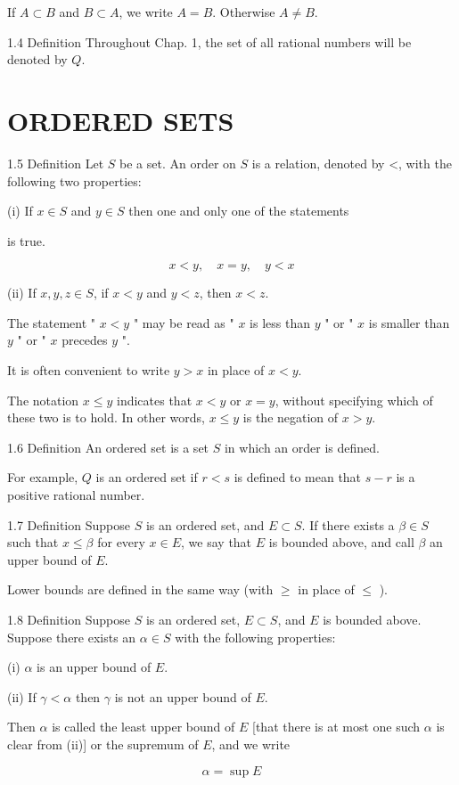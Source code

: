 \documentclass[10pt]{article}
\begin{document}
If $A \subset B$ and $B \subset A$, we write $A=B$. Otherwise $A \neq B$.

1.4 Definition Throughout Chap. 1, the set of all rational numbers will be denoted by $Q$.

\section{ORDERED SETS}
1.5 Definition Let $S$ be a set. An order on $S$ is a relation, denoted by <, with the following two properties:

(i) If $x \in S$ and $y \in S$ then one and only one of the statements

is true.

$$
x<y, \quad x=y, \quad y<x
$$

(ii) If $x, y, z \in S$, if $x<y$ and $y<z$, then $x<z$.

The statement " $x<y$ " may be read as " $x$ is less than $y$ " or " $x$ is smaller than $y$ " or " $x$ precedes $y$ ".

It is often convenient to write $y>x$ in place of $x<y$.

The notation $x \leq y$ indicates that $x<y$ or $x=y$, without specifying which of these two is to hold. In other words, $x \leq y$ is the negation of $x>y$.

1.6 Definition An ordered set is a set $S$ in which an order is defined.

For example, $Q$ is an ordered set if $r<s$ is defined to mean that $s-r$ is a positive rational number.

1.7 Definition Suppose $S$ is an ordered set, and $E \subset S$. If there exists a $\beta \in S$ such that $x \leq \beta$ for every $x \in E$, we say that $E$ is bounded above, and call $\beta$ an upper bound of $E$.

Lower bounds are defined in the same way (with $\geq$ in place of $\leq$ ).

1.8 Definition Suppose $S$ is an ordered set, $E \subset S$, and $E$ is bounded above. Suppose there exists an $\alpha \in S$ with the following properties:

(i) $\alpha$ is an upper bound of $E$.

(ii) If $\gamma<\alpha$ then $\gamma$ is not an upper bound of $E$.

Then $\alpha$ is called the least upper bound of $E$ [that there is at most one such $\alpha$ is clear from (ii)] or the supremum of $E$, and we write

$$
\alpha=\sup E
$$
\end{document}
